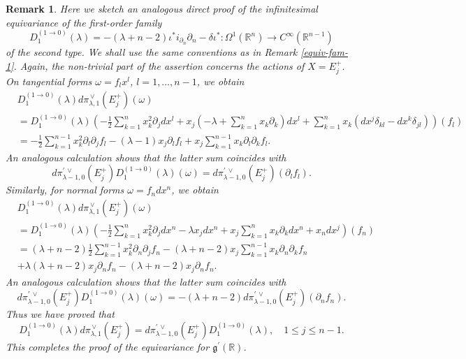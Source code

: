 \documentclass[a4paper,12pt,reqno]{amsart}
\newtheorem{bem}[theorem]{Remark}
\numberwithin{theorem}{subsection}
\numberwithin{equation}{section}
\begin{document}
\begin{bem}\label{equiv-fam-2} Here we sketch an analogous direct proof of the infinitesimal
equivariance of the first-order family
$$
   D_1^{(1 \to 0)}(\lambda) = -(\lambda\!+\!n\!-\!2) \iota^* i_{\partial_n} \partial_n - \delta
   \iota^*: \Omega^1({\mathbb{R}}^n) \to C^\infty({\mathbb{R}}^{n-1})
$$
of the second type. We shall use the same conventions as in Remark
\ref{equiv-fam-1}. Again, the non-trivial part of the assertion concerns the
actions of $X=E_j^+$. On tangential forms $\omega = f_lx^l$, $l=1,\dots,n-1$,
we obtain
\begin{align*}
   & D^{(1 \to 0)}_1(\lambda) {d}\pi^{{\,\vee}}_{\lambda,1}(E_j^+)(\omega) \\
   & = D^{(1 \to 0)}_1(\lambda)
   \left(-\tfrac 12 \sum_{k=1}^n x_k^2 \partial_{j} dx^l + x_j(-\lambda+\sum_{k=1}^nx_k\partial_{k}) dx^l
   + \sum_{k=1}^{n} x_k (dx^j \delta_{kl} - dx^k \delta_{jl})\right) (f_l) \\
   & = -\tfrac{1}{2} \sum_{k=1}^{n-1} x_k^2 \partial_l \partial_j f_l
   - (\lambda-1) x_j \partial_l f_l + x_j \sum_{k=1}^{n-1} x_k \partial_l \partial_k f_l.
\end{align*}
An analogous calculation shows that the latter sum coincides with
$$
   {d}\pi^{\prime {{\,\vee}}}_{\lambda-1,0}(E_j^+) D^{(1 \to 0)}_1(\lambda)(\omega) =
   {d}\pi^{\prime {{\,\vee}}}_{\lambda-1,0}(E_j^+)(\partial_l f_l).
$$
Similarly, for normal forms $\omega = f_n dx^n$, we obtain
\begin{align*}
    & D^{(1\to 0)}_1(\lambda) {d}\pi^{{\,\vee}}_{\lambda,1}(E_j^+)(\omega) \\
    & = D^{(1\to 0)}_1(\lambda)
    \left(-\tfrac 12 \sum_{k=1}^n x_k^2 \partial_{j} dx^n -\lambda x_j dx^n + x_j \sum_{k=1}^n x_k\partial_{k}
    dx^n + x_n dx^j \right) (f_n) \\
    & = (\lambda\!+\!n\!-\!2) \tfrac{1}{2} \sum_{k=1}^{n-1} x_k^2 \partial_n
    \partial_j f_n - (\lambda\!+\!n\!-\!2) x_j \sum_{k=1}^{n-1} x_k \partial_n \partial_k f_n \\
    & + \lambda(\lambda\!+\!n\!-\!2) x_j \partial_n f_n - (\lambda\!+\!n\!-\!2) x_j \partial_n f_n.
\end{align*}
An analogous calculation shows that the latter sum coincides with
$$
   {d}\pi^{\prime {{\,\vee}}}_{\lambda-1,0}(E_j^+) D^{(1\to 0)}_1(\lambda) (\omega) =
   -(\lambda\!+\!n\!-\!2) {d}\pi^{\prime {{\,\vee}}}_{\lambda-1,0}(E_j^+) (\partial_n f_n).
$$
Thus we have proved that
$$
   D^{(1 \to 0)}_1(\lambda) {d}\pi^{{\,\vee}}_{\lambda,1}(E_j^+)
   = {d}\pi^{\prime {{\,\vee}}}_{\lambda-1,0}(E_j^+) D^{(1\to 0)}_1(\lambda), \quad 1 \le j \le n-1.
$$
This completes the proof of the equivariance for ${{\mathfrak g}}^\prime({\mathbb{R}})$.
\end{bem}
\end{document}
